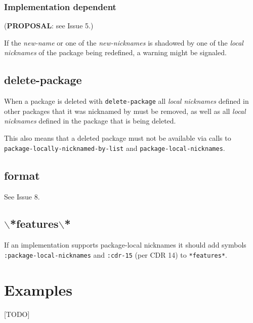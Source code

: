 \documentclass[11pt]{article}
\begin{document}
\subsubsection{Implementation dependent}
\label{sec:org50d244e}
(\textbf{PROPOSAL}: see Issue 5.)

If the \emph{new-name} or one of the \emph{new-nicknames} is shadowed by one of the \emph{local
nicknames} of the package being redefined, a warning might be signaled.
\subsection{delete-package}
\label{sec:org9e84727}
When a package is deleted with \texttt{delete-package} all \emph{local nicknames} defined in
other packages that it was nicknamed by must be removed, as well as all \emph{local
nicknames} defined in the package that is being deleted.

This also means that a deleted package must not be available via calls to
\texttt{package-locally-nicknamed-by-list} and \texttt{package-local-nicknames}.
\subsection{format}
\label{sec:orgefb4a01}
See Issue 8.
\subsection{$\backslash$*features$\backslash$*}
\label{sec:orgd36cf1b}
If an implementation supports package-local nicknames it should add symbols
\texttt{:package-local-nicknames} and \texttt{:cdr-15} (per CDR 14) to \texttt{*features*}.
\section{Examples}
\label{sec:orgc621836}
[TODO]
\end{document}

